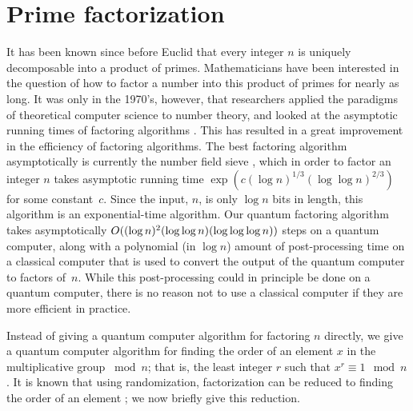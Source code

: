 \section{Prime factorization}
It has been known since before Euclid that every integer $n$ is uniquely
decomposable into a product of primes.  Mathematicians have been 
interested in the question of how to factor a number into this 
product of primes for nearly as long.  It was only in the 1970's, 
however, that researchers applied the paradigms of theoretical computer
science to number theory, and looked at the asymptotic running times
of factoring algorithms \cite{Adle}.  This has resulted in a great 
improvement in the efficiency of factoring algorithms.   The best
factoring algorithm asymptotically is currently the number field sieve
\cite{LeLeMaPo,LeLe}, which in order to factor an integer $n$ takes 
asymptotic running time 
$\exp(c(\log n)^{1/3} (\log \log n)^{2/3})$ for some constant~$c$.  
Since the input, $n$, is only $\log n$ bits in length, this
algorithm is an exponential-time algorithm.
Our quantum factoring algorithm takes asymptotically
$O((\log n)^2 \linebreak[1] (\log \log n) \linebreak[1] (\log \log \log n))$ 
steps on a quantum computer, along with a polynomial (in $\log n$) amount 
of post-processing time on a classical computer that is
used to convert the output of the quantum computer to factors 
of~$n$.  While this post-processing could in principle be done on a quantum
computer, there is no reason not to use a classical computer if they are
more efficient in practice.

Instead of giving a quantum computer algorithm for factoring $n$ directly,
we give a quantum computer algorithm for finding the order of
an element $x$ in the multiplicative group
$\bmod{n}$; that is, the least integer $r$ such that 
$x^r \equiv 1 \mod{n}$.  It is known that using randomization,
factorization can be reduced to finding the order of an element \cite{Mill}; 
we now briefly give this reduction.

